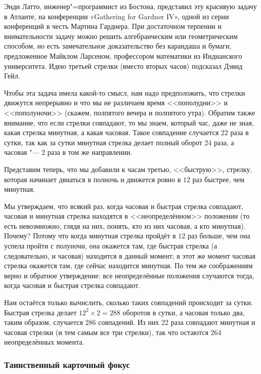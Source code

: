 \documentclass[twoside]{book}
\begin{document}
Энди Латто, инженер"=программист из Бостона, представил эту красивую задачу в Атланте, на конференции «Gathering for Gard\-ner IV», одной из серии конференций в честь Мартина Гарднера.
При достаточном терпении и внимательности задачу можно решить алгебраическим или геометрическим способом, но есть замечательное доказательство без карандаша и бумаги, предложенное Майклом Ларсеном, %
профессором математики из Индианского университета.
Идею третьей стрелки (вместо вторых часов) подсказал Дэвид Гейл. %

\medskip

Чтобы эта задача имела какой-то смысл, нам надо предположить, что стрелки движутся непрерывно и что
мы не различаем время <<пополудни>>  и <<пополуночи>> (скажем,
полпятого вечера и полпятого утра).
Обратим также внимание, что если стрелки совпадают, то мы знаем,
который час, даже не зная, какая стрелка минутная, а какая часовая.
Такое совпадение случается $22$ раза в сутки, так как за сутки минутная стрелка делает полный оборот $24$ раза, а часовая "--- $2$ раза в том же направлении.

Представим теперь, что мы добавили к часам третью, <<быструю>>,
стрелку, которая начинает двиаться в полночь и движется ровно в $12$
раз быстрее, чем минутная. 

Мы утверждаем, что всякий раз, когда часовая и быстрая стрелка
совпадают, часовая и минутная стрелка находятся в <<неопределённом>>
положении (то есть невозмножно, глядя на них, понять, кто из них
часовая, а кто минутная).
Почему?
Потому что когда минутная стрелка пройдёт в $12$ раз больше,
чем она успела пройти с полуночи, она окажется там, где быстрая
стрелка (а следовательно, и часовая) находится в данный момент; в этот
же момент часовая стрелка окажется там, где сейчас находится минутная.
По тем же соображениям верно и обратное утверждение: все неопределённые положения случаются тогда, когда часовая и быстрая стрелка совпадают.

Нам остаётся только вычислить, сколько таких совпадений происходит за сутки.
Быстрая стрелка делает $12^2\times 2 = 288$ оборотов в сутки, а часовая только два, таким образом, случается 286 совпадений.
Из них 22 раза совпадают минутная и часовая стрелки (и тем самым все
три стрелки), так что остаются 264 неопределённых момента. 
\heart

\subsubsection*{Таинственный карточный фокус}%
\end{document}
